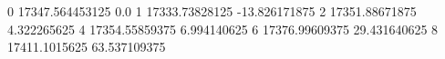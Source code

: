 0 17347.564453125 0.0
1 17333.73828125 -13.826171875
2 17351.88671875 4.322265625
4 17354.55859375 6.994140625
6 17376.99609375 29.431640625
8 17411.1015625 63.537109375
